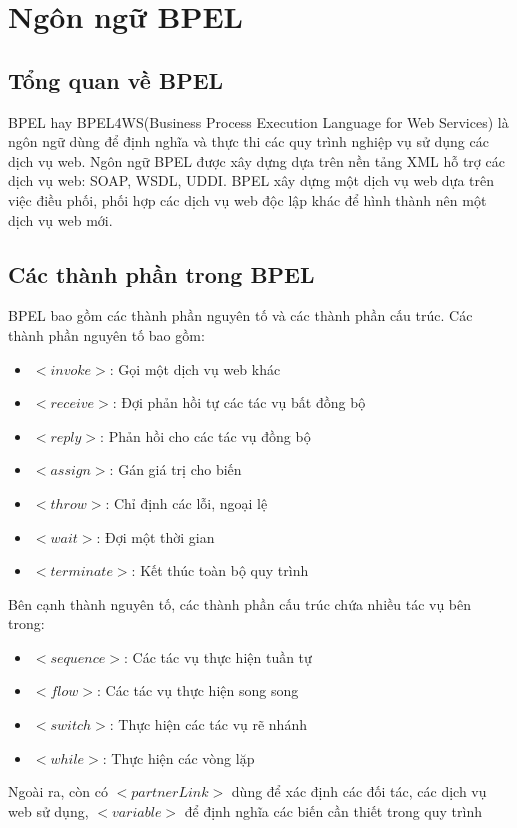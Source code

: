\section{Ngôn ngữ BPEL}
\subsection{Tổng quan về BPEL}
\hspace*{0.5cm} BPEL hay BPEL4WS(Business Process Execution Language for Web Services) là ngôn ngữ dùng để định nghĩa và thực thi các quy trình nghiệp vụ sử dụng các dịch vụ web. Ngôn ngữ BPEL được xây dựng dựa trên nền tảng XML hỗ trợ các dịch vụ web: SOAP, WSDL, UDDI. BPEL xây dựng một dịch vụ web dựa trên việc điều phối, phối hợp các dịch vụ web độc lập khác để hình thành nên một dịch vụ web mới.
\subsection{Các thành phần trong BPEL}
BPEL bao gồm các thành phần nguyên tố và các thành phần cấu trúc. Các thành phần nguyên tố bao gồm:
\begin{itemize}
	\item $<invoke>$: Gọi một dịch vụ web khác
	\item $<receive>$: Đợi phản hồi tự các tác vụ bất đồng bộ
	\item $<reply>$: Phản hồi cho các tác vụ đồng bộ
	\item $<assign>$: Gán giá trị cho biến
	\item $<throw>$: Chỉ định các lỗi, ngoại lệ
	\item $<wait>$: Đợi một thời gian
	\item $<terminate>$: Kết thúc toàn bộ quy trình
\end{itemize}

Bên cạnh thành nguyên tố, các thành phần cấu trúc chứa nhiều tác vụ bên trong:
\begin{itemize}
    \item $<sequence>$: Các tác vụ thực hiện tuần tự
    \item $<flow>$: Các tác vụ thực hiện song song
    \item $<switch>$: Thực hiện các tác vụ rẽ nhánh
    \item $<while>$: Thực hiện các vòng lặp
\end{itemize}
 
Ngoài ra, còn có $<partnerLink>$ dùng để xác định các đối tác, các dịch vụ web sử dụng, $<variable>$ để định nghĩa các biến cần thiết trong quy trình


